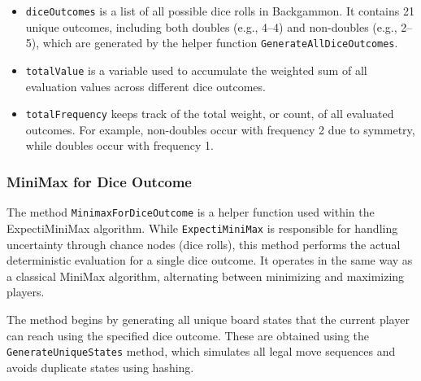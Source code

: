 \begin{itemize}
    \item \texttt{diceOutcomes} is a list of all possible dice rolls in Backgammon. It contains 21 unique outcomes, including both doubles (e.g., 4--4) and non-doubles (e.g., 2--5), which are generated by the helper function \texttt{GenerateAllDiceOutcomes}.
    
    \item \texttt{totalValue} is a variable used to accumulate the weighted sum of all evaluation values across different dice outcomes.
    
    \item \texttt{totalFrequency} keeps track of the total weight, or count, of all evaluated outcomes. For example, non-doubles occur with frequency 2 due to symmetry, while doubles occur with frequency 1.
\end{itemize}

\subsubsection{MiniMax for Dice Outcome}

The method \texttt{MinimaxForDiceOutcome} is a helper function used within the ExpectiMiniMax algorithm. While \texttt{ExpectiMiniMax} is responsible for handling uncertainty through chance nodes (dice rolls), this method performs the actual deterministic evaluation for a single dice outcome. It operates in the same way as a classical MiniMax algorithm, alternating between minimizing and maximizing players.

The method begins by generating all unique board states that the current player can reach using the specified dice outcome. These are obtained using the \texttt{GenerateUniqueStates} method, which simulates all legal move sequences and avoids duplicate states using hashing.




